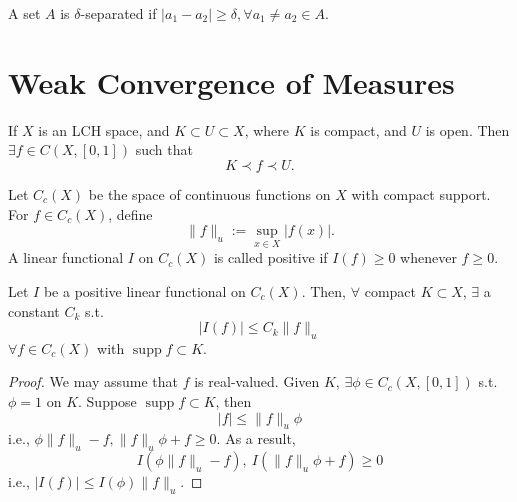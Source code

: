     \begin{remark}
    A set $A$ is $\delta$-separated if $|a_{1}-a_{2}|\geq \delta,\forall a_{1}\neq a_{2} \in A$.
    \end{remark}

    \section{Weak Convergence of Measures}

    \begin{theorem}
    If $X$ is an LCH space, and $K\subset U\subset X$, where $K$ is compact, and $U$ is open. Then $\exists f \in C(X,[0,1])$ such that
        \begin{equation*}
            K\prec f\prec U.
        \end{equation*}
    \label{thm:urysohn}
    \end{theorem}

    Let $C_{c}(X)$ be the space of continuous functions on $X$ with compact support. For $f \in C_{c}(X)$, define
        \begin{equation*}
            \|f\|_{u}:=\sup_{x \in X}|f(x)|.
        \end{equation*}
    A linear functional $I$ on $C_{c}(X)$ is called positive if $I(f)\geq 0$ whenever $f\geq 0$.

    \begin{proposition}
    Let $I$ be a positive linear functional on $C_{c}(X)$. Then, $\forall$ compact $K\subset X$, $\exists$ a constant $C_{k}$ s.t.
        \begin{equation*}
            |I(f)|\leq C_{k}\| f \| _{u}
        \end{equation*}
    $\forall f\in C_{c}(X)$ with $\operatorname{supp}f\subset K$.
    \label{prop:lin_bound}
    \end{proposition}
    \begin{proof}
    We may assume that $f$ is real-valued. Given $K$, $\exists \phi \in C_{c}(X,[0,1])$ s.t. $\phi=1$ on $K$. Suppose $\operatorname{supp}f \subset K$, then
        \begin{equation*}
            |f| \leq \|f\|_{u}\phi
        \end{equation*}
    i.e., $\phi\|f\|_{u}-f,\|f\|_{u}\phi+f\geq 0$.
    As a result,
        \begin{equation*}
            I(\phi\|f\|_{u}-f),\ I(\|f\|_{u}\phi+f)\geq 0
        \end{equation*}
    i.e., $|I(f)|\leq I(\phi)\|f\|_{u}$.
    \end{proof}

